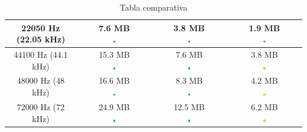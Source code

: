 \documentclass[11pt,a4paper]{article}
\begin{document}
\begin{table}[H]
\begin{tabular}{|c|c|c|c|}
22050 Hz (22.05 kHz) & \makecell{7.6 MB\\ \includegraphics[width=0.03\textwidth]{mb.png}} & \makecell{3.8 MB\\ \includegraphics[width=0.03\textwidth]{mb.png}} & \makecell{1.9 MB\\ \includegraphics[width=0.03\textwidth]{m.png}} \\ \hline

44100 Hz (44.1 kHz) & \makecell{15.3 MB\\ \includegraphics[width=0.03\textwidth]{mb.png}} & \makecell{7.6 MB\\ \includegraphics[width=0.03\textwidth]{mb.png}} & \makecell{3.8 MB\\ \includegraphics[width=0.03\textwidth]{r.png}} \\ \hline

48000 Hz (48 kHz) & \makecell{16.6 MB\\ \includegraphics[width=0.03\textwidth]{mb.png}} & \makecell{8.3 MB\\ \includegraphics[width=0.03\textwidth]{mb.png}} & \makecell{4.2 MB\\ \includegraphics[width=0.03\textwidth]{r.png}} \\ \hline

72000 Hz (72 kHz) & \makecell{24.9 MB\\ \includegraphics[width=0.03\textwidth]{mb.png}} & \makecell{12.5 MB\\ \includegraphics[width=0.03\textwidth]{mb.png}} & \makecell{6.2 MB\\\includegraphics[width=0.03\textwidth]{r.png}} \\ \hline
\end{tabular}
\caption{Tabla comparativa}
\label{my-label}
\end{table}
\end{document}
